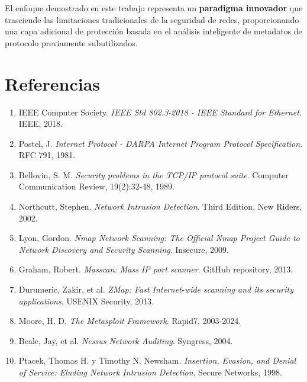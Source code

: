 \documentclass[12pt,a4paper]{article}
\begin{document}
El enfoque demostrado en este trabajo representa un \textbf{paradigma innovador} que trasciende las limitaciones tradicionales de la seguridad de redes, proporcionando una capa adicional de protección basada en el análisis inteligente de metadatos de protocolo previamente subutilizados.

\section*{Referencias}

\begin{enumerate}
    \item IEEE Computer Society. \textit{IEEE Std 802.3-2018 - IEEE Standard for Ethernet}. IEEE, 2018.
    
    \item Postel, J. \textit{Internet Protocol - DARPA Internet Program Protocol Specification}. RFC 791, 1981.
    
    \item Bellovin, S. M. \textit{Security problems in the TCP/IP protocol suite}. Computer Communication Review, 19(2):32-48, 1989.
    
    \item Northcutt, Stephen. \textit{Network Intrusion Detection}. Third Edition, New Riders, 2002.
    
    \item Lyon, Gordon. \textit{Nmap Network Scanning: The Official Nmap Project Guide to Network Discovery and Security Scanning}. Insecure, 2009.
    
    \item Graham, Robert. \textit{Masscan: Mass IP port scanner}. GitHub repository, 2013.
    
    \item Durumeric, Zakir, et al. \textit{ZMap: Fast Internet-wide scanning and its security applications}. USENIX Security, 2013.
    
    \item Moore, H. D. \textit{The Metasploit Framework}. Rapid7, 2003-2024.
    
    \item Beale, Jay, et al. \textit{Nessus Network Auditing}. Syngress, 2004.
    
    \item Ptacek, Thomas H. y Timothy N. Newsham. \textit{Insertion, Evasion, and Denial of Service: Eluding Network Intrusion Detection}. Secure Networks, 1998.
\end{enumerate}
\end{document}
